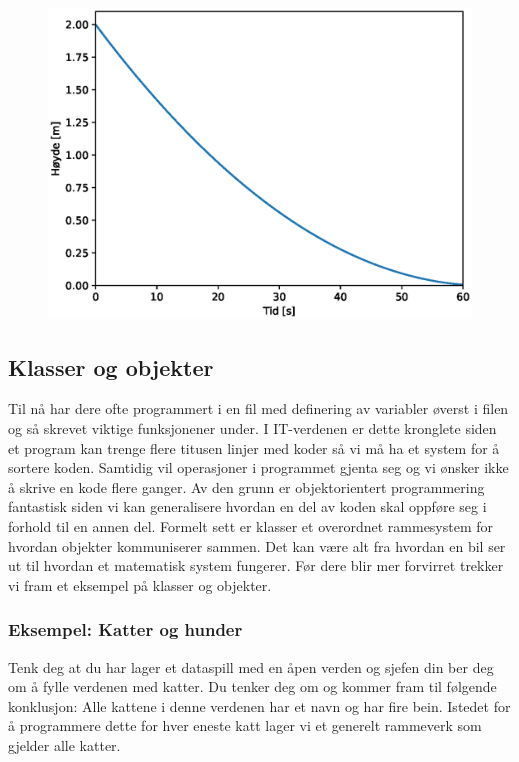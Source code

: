 \begin{figure}[h!]
    \centering
    \includegraphics[scale=0.8]{Text/tank.eps}
    \caption{}
    \label{fig:ODE_tank_plot}
\end{figure}

\newpage
\subsection{Klasser og objekter}
Til nå har dere ofte programmert i en fil med definering av variabler øverst i filen og så skrevet viktige funksjonener under. I IT-verdenen er dette kronglete siden et program kan trenge flere titusen linjer med koder så vi må ha et system for å sortere koden. Samtidig vil operasjoner i programmet gjenta seg og vi ønsker ikke å skrive en kode flere ganger. Av den grunn er objektorientert programmering fantastisk siden vi kan generalisere hvordan en del av koden skal oppføre seg i forhold til en annen del. Formelt sett er klasser et overordnet rammesystem for hvordan objekter kommuniserer sammen. Det kan være alt fra hvordan en bil ser ut til hvordan et matematisk system fungerer. Før dere blir mer forvirret trekker vi fram et eksempel på klasser og objekter.

\subsubsection{Eksempel: Katter og hunder}
Tenk deg at du har lager et dataspill med en åpen verden og sjefen din ber deg om å fylle verdenen med katter. Du tenker deg om og kommer fram til følgende konklusjon: Alle kattene i denne verdenen har et navn og har fire bein. Istedet for å programmere dette for hver eneste katt lager vi et generelt rammeverk som gjelder alle katter.

